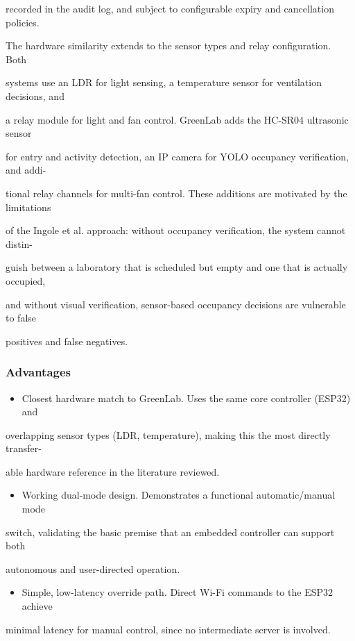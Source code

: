 recorded in the audit log, and subject to conﬁgurable expiry and cancellation policies.

The hardware similarity extends to the sensor types and relay conﬁguration. Both

systems use an LDR for light sensing, a temperature sensor for ventilation decisions, and

a relay module for light and fan control. GreenLab adds the HC-SR04 ultrasonic sensor

for entry and activity detection, an IP camera for YOLO occupancy veriﬁcation, and addi-

tional relay channels for multi-fan control. These additions are motivated by the limitations

of the Ingole et al. approach: without occupancy veriﬁcation, the system cannot distin-

guish between a laboratory that is scheduled but empty and one that is actually occupied,

and without visual veriﬁcation, sensor-based occupancy decisions are vulnerable to false

positives and false negatives.


\subsubsection*{Advantages}
\begin{itemize}
	\item Closest hardware match to GreenLab. Uses the same core controller (ESP32) and
\end{itemize}
overlapping sensor types (LDR, temperature), making this the most directly transfer-

able hardware reference in the literature reviewed.

\begin{itemize}
	\item Working dual-mode design. Demonstrates a functional automatic/manual mode
\end{itemize}
switch, validating the basic premise that an embedded controller can support both

autonomous and user-directed operation.

\begin{itemize}
	\item Simple, low-latency override path. Direct Wi-Fi commands to the ESP32 achieve
\end{itemize}
minimal latency for manual control, since no intermediate server is involved.


